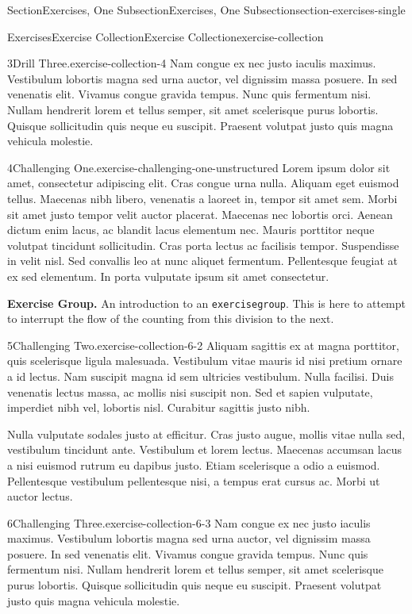 \documentclass[twoside,10pt,]{article}
\newcommand{\mono}[1]{\texttt{#1}}
\numberwithin{equation}{section}
\begin{document}
\begin{sectionptx}{Section}{Exercises, One Subsection}{}{Exercises, One Subsection}{}{}{section-exercises-single}
\begin{exercises-subsection-numberless}{Exercises}{Exercise Collection}{}{Exercise Collection}{}{}{exercise-collection}
\begin{divisionexercise}{3}{Drill Three.}{}{exercise-collection-4}
Nam congue ex nec justo iaculis maximus. Vestibulum lobortis magna sed urna auctor, vel dignissim massa posuere. In sed venenatis elit. Vivamus congue gravida tempus. Nunc quis fermentum nisi. Nullam hendrerit lorem et tellus semper, sit amet scelerisque purus lobortis. Quisque sollicitudin quis neque eu suscipit. Praesent volutpat justo quis magna vehicula molestie.%
\end{divisionexercise}%
\begin{divisionexercise}{4}{Challenging One.}{}{exercise-challenging-one-unstructured}%
Lorem ipsum dolor sit amet, consectetur adipiscing elit. Cras congue urna nulla. Aliquam eget euismod tellus. Maecenas nibh libero, venenatis a laoreet in, tempor sit amet sem. Morbi sit amet justo tempor velit auctor placerat. Maecenas nec lobortis orci. Aenean dictum enim lacus, ac blandit lacus elementum nec. Mauris porttitor neque volutpat tincidunt sollicitudin. Cras porta lectus ac facilisis tempor. Suspendisse in velit nisl. Sed convallis leo at nunc aliquet fermentum. Pellentesque feugiat at ex sed elementum. In porta vulputate ipsum sit amet consectetur.%
\end{divisionexercise}%
\par\medskip\noindent%
\textbf{Exercise Group.}\space\space%
An introduction to an \mono{exercisegroup}.  This is here to attempt to interrupt the flow of the counting from this division to the next.%
\begin{exercisegroup}
\begin{divisionexerciseeg}{5}{Challenging Two.}{}{exercise-collection-6-2}%
Aliquam sagittis ex at magna porttitor, quis scelerisque ligula malesuada. Vestibulum vitae mauris id nisi pretium ornare a id lectus. Nam suscipit magna id sem ultricies vestibulum. Nulla facilisi. Duis venenatis lectus massa, ac mollis nisi suscipit non. Sed et sapien vulputate, imperdiet nibh vel, lobortis nisl. Curabitur sagittis justo nibh.%
\par
Nulla vulputate sodales justo at efficitur. Cras justo augue, mollis vitae nulla sed, vestibulum tincidunt ante. Vestibulum et lorem lectus. Maecenas accumsan lacus a nisi euismod rutrum eu dapibus justo. Etiam scelerisque a odio a euismod. Pellentesque vestibulum pellentesque nisi, a tempus erat cursus ac. Morbi ut auctor lectus.%
\end{divisionexerciseeg}%
\begin{divisionexerciseeg}{6}{Challenging Three.}{}{exercise-collection-6-3}%
Nam congue ex nec justo iaculis maximus. Vestibulum lobortis magna sed urna auctor, vel dignissim massa posuere. In sed venenatis elit. Vivamus congue gravida tempus. Nunc quis fermentum nisi. Nullam hendrerit lorem et tellus semper, sit amet scelerisque purus lobortis. Quisque sollicitudin quis neque eu suscipit. Praesent volutpat justo quis magna vehicula molestie.%

\end{divisionexerciseeg}
\end{exercisegroup}
\end{exercises-subsection-numberless}
\end{sectionptx}
\end{document}
